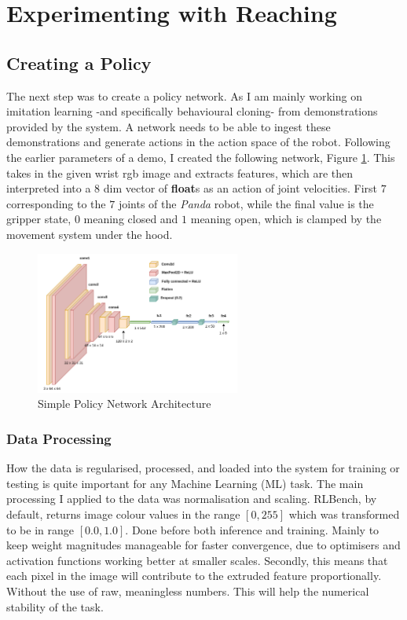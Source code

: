 \section{Experimenting with Reaching}\label{sec:reach-no-obs}

\subsection{Creating a Policy}
The next step was to create a policy network. As I am mainly working on imitation learning -and specifically behavioural cloning- from demonstrations provided by the system. A network needs to be able to ingest these demonstrations and generate actions in the action space of the robot. Following the earlier parameters of a demo, I created the following network, Figure \ref{fig:policy-arch}. This takes in the given wrist rgb image and extracts features, which are then interpreted into a $8$ dim vector of \textbf{float}s as an action of joint velocities. First $7$ corresponding to the $7$ joints of the \emph{Panda} robot, while the final value is the gripper state, $0$ meaning closed and $1$ meaning open, which is clamped by the movement system under the hood.

\begin{figure}[h]
  \centering
  \includegraphics[width=0.6\textwidth]{assets/early-work/cnn-encoder-policy-head.png}
  \caption{Simple Policy Network Architecture}\label{fig:policy-arch}
\end{figure}


\subsubsection{Data Processing}
How the data is regularised, processed, and loaded into the system for training or testing is quite important for any Machine Learning (ML) task. The main processing I applied to the data was normalisation and scaling. RLBench, by default, returns image colour values in the range \(\left[0, 255\right]\) which was transformed to be in range \(\left[0.0, 1.0\right]\). Done before both inference and training. Mainly to keep weight magnitudes manageable for faster convergence, due to optimisers and activation functions working better at smaller scales. Secondly, this means that each pixel in the image will contribute to the extruded feature proportionally. Without the use of raw, meaningless numbers. This will help the numerical stability of the task.

